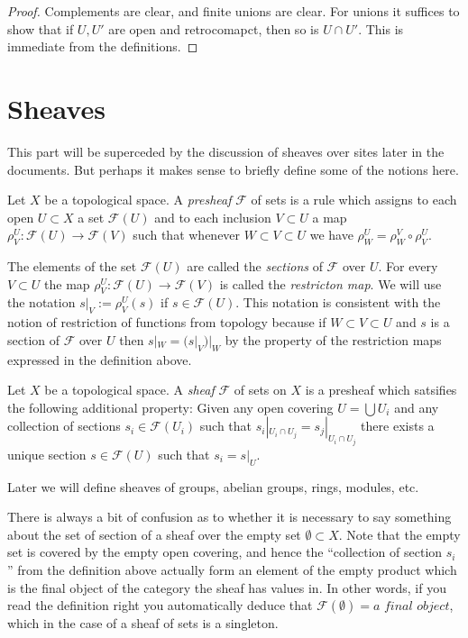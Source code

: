 \begin{proof}
Complements are clear, and finite unions are clear.
For unions it suffices to show that if $U, U'$ are
open and retrocomapct, then so is $U \cap U'$.
This is immediate from the definitions.
\end{proof}


\section{Sheaves}
\label{section-sheaves}

\noindent
This part will be superceded by the discussion of sheaves
over sites later in the documents. But perhaps it makes 
sense to briefly define some of the notions here.

\begin{definition}
\label{definition-presheaf}
Let $X$ be a topological space.
A {\it presheaf} $\mathcal{F}$ of sets is a rule which
assigns to each open $U \subset X$ a set $\mathcal{F}(U)$ and
to each inclusion $V \subset U$ a map
$\rho^U_V : \mathcal{F}(U) \to \mathcal{F}(V)$ such that
whenever $W \subset V \subset U$ we have 
$\rho^U_W = \rho^V_W \circ \rho ^U_V$.
\end{definition}

\noindent
The elements of the set $\mathcal{F}(U)$ are called
the {\it sections} of $\mathcal{F}$ over $U$.
For every $V \subset U$ the map
$\rho^U_V : \mathcal{F}(U) \to \mathcal{F}(V)$
is called the {\it restricton map}. We will use the
notation $s|_V := \rho^U_V(s)$ if $s\in \mathcal{F}(U)$.
This notation is consistent with the notion of restriction
of functions from topology because if $W \subset V \subset U$
and $s$ is a section of $\mathcal{F}$ over $U$ then
$s|_W = (s|_V)|_W$ by the property of the restriction maps
expressed in the definition above.

\begin{definition}
\label{definition-sheaf}
Let $X$ be a topological space.
A {\it sheaf} $\mathcal{F}$ of sets on $X$ is a presheaf
which satsifies the following additional property: Given
any open covering $U = \bigcup U_i$ and any collection
of sections $s_i \in \mathcal{F}(U_i)$ such that
$s_i|_{U_i \cap U_j} = s_j|_{U_i \cap U_j}$ there exists
a unique section $s \in \mathcal{F}(U)$ such that
$s_i = s|_U$.
\end{definition}

\noindent
Later we will define sheaves of groups, abelian groups,
rings, modules, etc.

\begin{remark}
There is always a bit of confusion as to whether it is
necessary to say something about the set of section of
a sheaf over the empty set $\emptyset \subset X$.
Note that the empty set is
covered by the empty open covering, and hence the ``collection
of section $s_i$'' from the definition above actually form
an element of the empty product which is the final object
of the category the sheaf has values in. In other words,
if you read the definition right you automatically deduce
that $\mathcal{F}(\emptyset) = \textit{a final object}$,
which in the case of a sheaf of sets is a singleton.
\end{remark}

